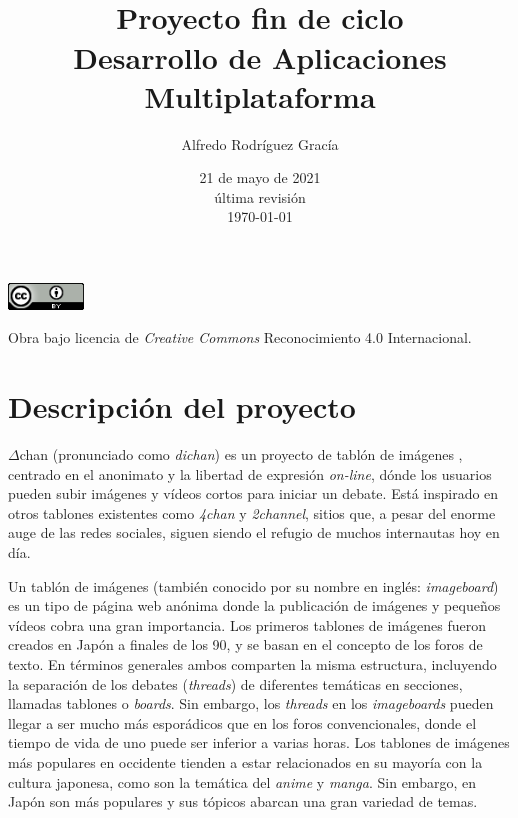 \documentclass[12pt,a4paper,titlepage]{article}
\title{\projectname\\\bigskip\normalsize{Proyecto fin de ciclo\\Desarrollo de Aplicaciones Multiplataforma}}
\author{Alfredo Rodríguez Gracía}
\date{21 de mayo de 2021\\\bigskip\scriptsize{última revisión\\\today}}
\newcommand\projectname{$\Delta$chan}
\begin{document}
    \maketitle
    \tableofcontents
    \vspace{\fill}
    \begin{center}
        \includegraphics[width=0.15\textwidth]{media/cc-by-large.png}

        \small{Obra bajo licencia de \textit{Creative Commons} Reconocimiento 4.0 Internacional.}
    \end{center}
    \newpage

    \section{Descripción del proyecto}



    {\projectname} (pronunciado como \textit{dichan}) es un proyecto de tablón de imágenes \cite{wiki:imageboard}, centrado en el anonimato y la libertad de expresión \textit{on-line}, dónde los usuarios pueden subir imágenes y vídeos cortos para iniciar un debate. Está inspirado en otros tablones existentes como \emph{4chan} y \emph{2channel}, sitios que, a pesar del enorme auge de las redes sociales, siguen siendo el refugio de muchos internautas hoy en día.

    Un tablón de imágenes (también conocido por su nombre en inglés: \textit{imageboard}) es un tipo de página web anónima donde la publicación de imágenes y pequeños vídeos cobra una gran importancia. Los primeros tablones de imágenes fueron creados en Japón a finales de los 90, y se basan en el concepto de los foros de texto. En términos generales ambos comparten la misma estructura, incluyendo la separación de los debates (\textit{threads}) de diferentes temáticas en secciones, llamadas tablones o \textit{boards}. Sin embargo, los \textit{threads} en los \textit{imageboards} pueden llegar a ser mucho más esporádicos que en los foros convencionales, donde el tiempo de vida de uno puede ser inferior a varias horas. Los tablones de imágenes más populares en occidente tienden a estar relacionados en su mayoría con la cultura japonesa, como son la temática del \emph{anime} y \emph{manga}. Sin embargo, en Japón son más populares y sus tópicos abarcan una gran variedad de temas.
\end{document}
